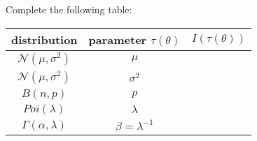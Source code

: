 \begin{ex}
    Complete the following table: 
    \begin{center}
        \begin{tabular}{ccc}
            \hline
            distribution & parameter $\tau(\theta)$ & $I(\tau(\theta))$ \\ \hline
            $\mathcal{N}(\mu, \sigma^2)$ & $\mu$ &  \\
            $\mathcal{N}(\mu, \sigma^2)$ & $\sigma^2$ &  \\
            $B(n,p)$ & $p$ &  \\
            $Poi(\lambda)$ & $\lambda$ &  \\
            $\Gamma(\alpha, \lambda)$ & $\beta=\lambda^{-1}$ &  \\
            \hline
            \end{tabular}
    \end{center}
\end{ex}